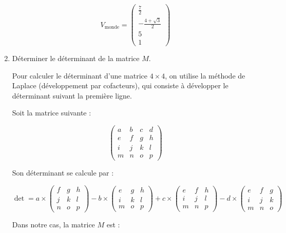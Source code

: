 \documentclass[a4paper,12pt]{article}
\begin{document}
\begin{enumerate}
    \[
    \boxed{
    V_{\text{monde}} = 
      \begin{pmatrix} \frac{7}{2} \\ -\frac{4 +\sqrt{3}}{2} \\ 5 \\ 1 \end{pmatrix}
    }
    \] \newline

  \item Déterminer le déterminant de la matrice $M$. \newline

    Pour calculer le déterminant d’une matrice \(4 \times 4\), on utilise la méthode de Laplace (développement par cofacteurs), qui consiste à développer le déterminant suivant la première ligne.

    Soit la matrice suivante :

    \[
    \begin{pmatrix}
    a & b & c & d \\
    e & f & g & h \\
    i & j & k & l \\
    m & n & o & p
    \end{pmatrix}
    \]

    Son déterminant se calcule par :

    \[
    \det =
    a \times 
    \begin{pmatrix}
    f & g & h \\
    j & k & l \\
    n & o & p
    \end{pmatrix}
    - b \times 
    \begin{pmatrix}
    e & g & h \\
    i & k & l \\
    m & o & p
    \end{pmatrix}
    + c \times 
    \begin{pmatrix}
    e & f & h \\
    i & j & l \\
    m & n & p
    \end{pmatrix}
    - d \times 
    \begin{pmatrix}
    e & f & g \\
    i & j & k \\
    m & n & o
    \end{pmatrix}
    \]

    Dans notre cas, la matrice \(M\) est :

    \newpage


\end{enumerate}
\end{document}
